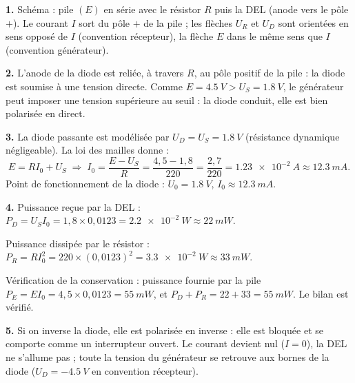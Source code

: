 \documentclass[11pt]{article}
\begin{document}
\begin{corrige}
\textbf{1.} Schéma : pile $(E)$ en série avec le résistor $R$ puis la DEL (anode vers le pôle $+$). Le courant $I$ sort du pôle $+$ de la pile ; les flèches $U_R$ et $U_D$ sont orientées en sens opposé de $I$ (convention récepteur), la flèche $E$ dans le même sens que $I$ (convention générateur).

\textbf{2.} L'anode de la diode est reliée, à travers $R$, au pôle positif de la pile : la diode est soumise à une tension directe. Comme $E = \SI{4,5}{V} > U_S = \SI{1,8}{V}$, le générateur peut imposer une tension supérieure au seuil : la diode conduit, elle est bien polarisée en direct.

\textbf{3.} La diode passante est modélisée par $U_D = U_S = \SI{1,8}{V}$ (résistance dynamique négligeable). La loi des mailles donne :
\[ E = RI_0 + U_S \;\Longrightarrow\; I_0 = \frac{E - U_S}{R} = \frac{4,5 - 1,8}{220} = \frac{2,7}{220} = \SI{1,23e-2}{A} \approx \SI{12,3}{mA}. \]
Point de fonctionnement de la diode : $U_0 = \SI{1,8}{V}$, $I_0 \approx \SI{12,3}{mA}$.

\textbf{4.} Puissance reçue par la DEL : $P_D = U_S I_0 = 1,8 \times 0,0123 = \SI{2,2e-2}{W} \approx \SI{22}{mW}$.

Puissance dissipée par le résistor : $P_R = RI_0^2 = 220 \times (0,0123)^2 = \SI{3,3e-2}{W} \approx \SI{33}{mW}$.

Vérification de la conservation : puissance fournie par la pile $P_E = E I_0 = 4,5 \times 0,0123 = \SI{55}{mW}$, et $P_D + P_R = 22 + 33 = \SI{55}{mW}$. Le bilan est vérifié.

\textbf{5.} Si on inverse la diode, elle est polarisée en inverse : elle est bloquée et se comporte comme un interrupteur ouvert. Le courant devient nul ($I = 0$), la DEL ne s'allume pas ; toute la tension du générateur se retrouve aux bornes de la diode ($U_D = -\SI{4,5}{V}$ en convention récepteur).
\end{corrige}
\end{document}
